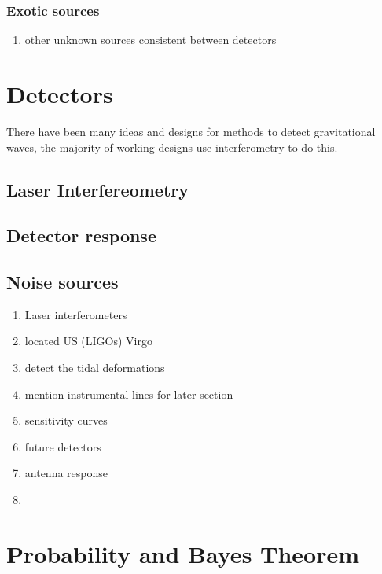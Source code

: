 \subsubsection{Exotic sources}

\begin{enumerate}
    \item other unknown sources consistent between detectors
\end{enumerate}

\section{\label{intro:detector}Detectors}

There have been many ideas and designs for methods to detect gravitational waves, the majority of working designs use interferometry to do this.

\subsection{Laser Interfereometry}

\subsection{Detector response}

\subsection{Noise sources}

\begin{enumerate}
    \item Laser interferometers
    \item located US (LIGOs) Virgo
    \item detect the tidal deformations 
    \item mention instrumental lines for later section
    \item sensitivity curves
    \item future detectors
    \item antenna response
    \item 
\end{enumerate}

\section{\label{intro:prob}Probability and Bayes Theorem}

